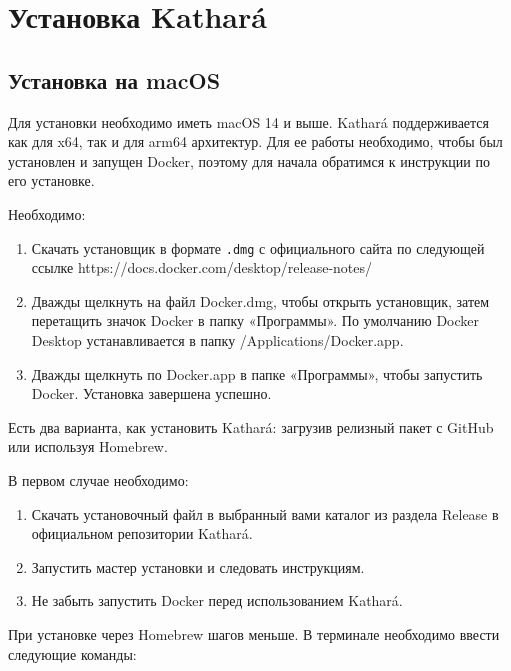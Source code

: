 \documentclass[
  english,
  russian,
  12pt,
  a4paper,
]{phdthesr}
\providecommand{\tightlist}{%
  \setlength{\itemsep}{0pt}\setlength{\parskip}{0pt}}
\begin{document}
\section{Установка
Kathará}\label{ux443ux441ux442ux430ux43dux43eux432ux43aux430-katharuxe1}

\subsection{Установка на
macOS}\label{ux443ux441ux442ux430ux43dux43eux432ux43aux430-ux43dux430-macos}

Для установки необходимо иметь macOS 14 и выше. Kathará поддерживается
как для x64, так и для arm64 архитектур. Для ее работы необходимо, чтобы
был установлен и запущен Docker, поэтому для начала обратимся к
инструкции по его установке.

Необходимо:

\begin{enumerate}
\def\labelenumi{\arabic{enumi}.}
\tightlist
\item
  Скачать установщик в формате \texttt{.dmg} с официального сайта по
  следующей ссылке https://docs.docker.com/desktop/release-notes/
\item
  Дважды щелкнуть на файл Docker.dmg, чтобы открыть установщик, затем
  перетащить значок Docker в папку «Программы». По умолчанию Docker
  Desktop устанавливается в папку /Applications/Docker.app.
\item
  Дважды щелкнуть по Docker.app в папке «Программы», чтобы запустить
  Docker. Установка завершена успешно.
\end{enumerate}

Есть два варианта, как установить Kathará: загрузив релизный пакет с
GitHub или используя Homebrew.

В первом случае необходимо:

\begin{enumerate}
\def\labelenumi{\arabic{enumi}.}
\tightlist
\item
  Скачать установочный файл в выбранный вами каталог из раздела Release
  в официальном репозитории Kathará.
\item
  Запустить мастер установки и следовать инструкциям.
\item
  Не забыть запустить Docker перед использованием Kathará.
\end{enumerate}

При установке через Homebrew шагов меньше. В терминале необходимо ввести
следующие команды:
\end{document}

